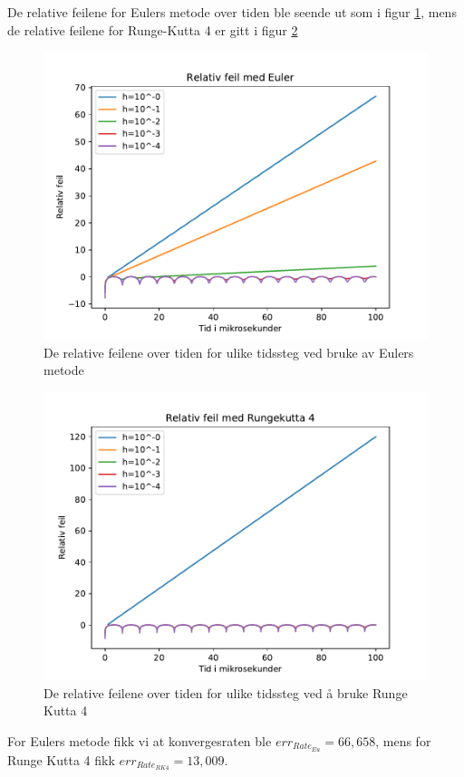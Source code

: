 \documentclass[reprint,english,notitlepage]{revtex4-1}  %
\begin{document}
De relative feilene for Eulers metode over tiden ble seende ut som i figur \ref{errEu}, mens de relative feilene for Runge-Kutta 4 er gitt i figur \ref{errRK4}
\begin{figure}[H]
	\label{errEu}
	\centering 
	\includegraphics[scale=0.4]{../pythonplots/RelerrEu.pdf}
	\caption{De relative feilene over tiden for ulike tidssteg ved bruke av Eulers metode}
\end{figure}
\begin{figure}[H]
	\label{errRK4}
	\centering 
	\includegraphics[scale=0.4]{../pythonplots/RelerrRK4.pdf}
	\caption{De relative feilene over tiden for ulike tidssteg ved å bruke Runge Kutta 4}
\end{figure}
For Eulers metode fikk vi at konvergesraten ble $err_{Rate_{Eu}}=66,658$, mens for Runge Kutta 4 fikk $err_{Rate_{RK4}}=13,009$.
\end{document}
